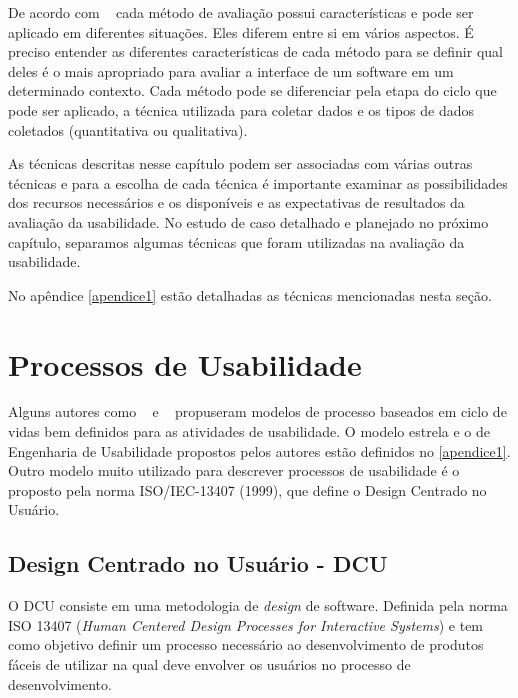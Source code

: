 De acordo com ~ cada método de avaliação possui características e pode ser aplicado em diferentes situações.
%
Eles diferem entre si em vários aspectos. É preciso entender as diferentes características de cada método para se definir qual deles é o mais apropriado para avaliar a interface de um software em um determinado contexto.
%
Cada método pode se diferenciar pela etapa do ciclo que pode ser aplicado, a técnica utilizada para coletar dados e os tipos de dados coletados (quantitativa ou qualitativa). 

As técnicas descritas nesse capítulo podem ser associadas com várias outras técnicas e para a escolha de cada técnica é importante examinar as possibilidades dos recursos necessários e os disponíveis e as expectativas de resultados da avaliação da usabilidade. 
%
No estudo de caso detalhado e planejado no próximo capítulo, separamos algumas técnicas que foram utilizadas na avaliação da usabilidade.

No apêndice \ref{apendice1} estão detalhadas as técnicas mencionadas nesta seção.

%



\section{Processos de Usabilidade}


	Alguns autores como ~ e ~ propuseram modelos de processo baseados em ciclo de vidas bem definidos para as atividades de usabilidade. O modelo estrela e o de Engenharia de Usabilidade propostos pelos autores estão definidos no \ref{apendice1}. 
	Outro modelo muito utilizado para descrever processos de usabilidade é o proposto pela norma ISO/IEC-13407 (1999), que define o Design Centrado no Usuário.


\subsection{Design Centrado no Usuário - DCU}

O DCU consiste em uma metodologia de \emph{design} de software. Definida pela norma ISO 13407 (\textit{Human Centered Design Processes for Interactive Systems}) e tem como objetivo definir um processo necessário ao desenvolvimento de produtos fáceis de utilizar na qual deve envolver os usuários no processo de desenvolvimento.

